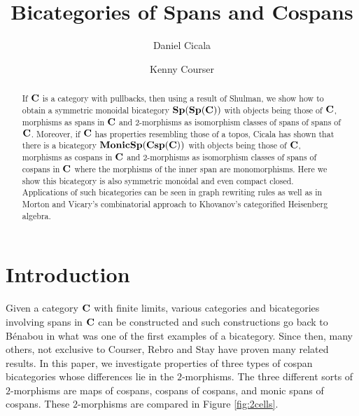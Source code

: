 \documentclass[11pt]{amsart}
\theoremstyle{remark}
\theoremstyle{definition}
\begin{document}
	

\begin{abstract}
If $\bold{C}$ is a category with pullbacks, then using a result of Shulman, we show how to obtain a symmetric monoidal bicategory $\bold{Sp(Sp(C))}$ with objects being those of $\bold{C}$, morphisms as spans in $\bold{C}$ and $2$-morphisms as isomorphism classes of spans of spans of $\bold{C}$. Moreover, if $\bold{C}$ has properties resembling those of a topos, Cicala has shown that there is a bicategory $\bold{MonicSp(Csp(C))}$ with objects being those of $\bold{C}$, morphisms as cospans in $\bold{C}$ and $2$-morphisms as isomorphism classes of spans of cospans in $\bold{C}$ where the morphisms of the inner span are monomorphisms. Here we show this bicategory is also symmetric monoidal and even compact closed. Applications of such bicategories can be seen in graph rewriting rules as well as in Morton and Vicary's combinatorial approach to Khovanov's categorified Heisenberg algebra.
\end{abstract}

\title{Bicategories of Spans and Cospans}
\author{Daniel Cicala \and Kenny Courser}
\maketitle

\section{Introduction} %
\label{sec:Introduction}


Given a category $\bold{C}$ with finite limits, various categories and bicategories involving spans in $\bold{C}$ can be constructed and such constructions go back to B\'enabou \cite{Be} in what was one of the first examples of a bicategory. Since then, many others, not exclusive to Courser, Rebro and Stay \cite{Cour,Reb,Stay} have proven many related results. In this paper, we investigate properties of three types of cospan bicategories whose differences lie in the $2$-morphisms.  The three different sorts of $2$-morphisms are maps of cospans, cospans of cospans, and monic spans of cospans.  These $2$-morphisms are compared in Figure \ref{fig:2cells}. 
\end{document}
